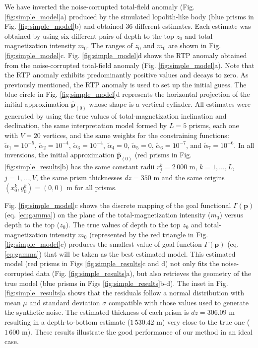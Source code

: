 We have inverted the noise-corrupted total-field anomaly (Fig. \ref{fig:simple_model}a) produced by the simulated lopolith-like body (blue prisms in Fig. \ref{fig:simple_model}b) and obtained 36 different estimates. 
Each estimate was obtained by using six different pairs of depth to the top $ z_0 $ and total-magnetization intensity $ m_0 $.
The ranges of $ z_0 $ and $ m_0 $ are shown in Fig. \ref{fig:simple_model}c. 
Fig. \ref{fig:simple_model}d shows the RTP anomaly obtained from the noise-corrupted 
total-field anomaly (Fig. \ref{fig:simple_model}a).
Note that the RTP anomaly exhibits predominantly positive values and decays to zero.
As previously mentioned, the RTP anomaly is used to set up the initial guess. 
The blue circle in Fig. \ref{fig:simple_model}d represents the horizontal projection 
of the initial approximation $\hat{\mathbf{p}}_{(0)}$ whose shape is a vertical cylinder.
All estimates were generated by using the true values of total-magnetization inclination and declination, the same interpretation model formed by $ L = 5 $ prisms, 
each one with $ V = 20 $ vertices, and the same weights for the constraining functions: 
$\tilde{\alpha}_1 = 10^{-5}$, 
$\tilde{\alpha}_2 = 10^{-4}$, 
$\tilde{\alpha}_3 = 10^{-4}$, 
$\tilde{\alpha}_4 = 0$, 
$\tilde{\alpha}_5 = 0$, 
$\tilde{\alpha}_6 = 10^{-7}$, and 
$\tilde{\alpha}_7 = 10^{-6}$. 
In all inversions, the initial approximation $\hat{\mathbf{p}}_{(0)}$ (red prisms in Fig. \ref{fig:simple_results}b) has the same constant radii $ r^k_j = 2\,000 $ m, 
$ k = 1, \dots, L $, $ j = 1, \dots, V $, the same prism thicknesses $ dz = 350 $ m and the same origins $(x^k_0, y^k_0) = (0, 0) $ m for all prisms.

Fig. \ref{fig:simple_model}c shows the discrete mapping of the goal functional 
$ \Gamma(\mathbf{p}) $ (eq. \ref{eq:gamma}) on the plane of the total-magnetization intensity ($ m_0 $) versus depth to the top ($ z_0 $). 
The true values of depth to the top $ z_0 $ and total-magnetization intensity $ m_0 $ (represented by the red triangle in Fig. \ref{fig:simple_model}c) produces 
the smallest value of goal function $ \Gamma(\mathbf{p}) $ (eq. \ref{eq:gamma})
that will be taken as the best estimated model.
This estimated model (red prisms in Figs \ref{fig:simple_results}c and d) 
not only fits the noise-corrupted data (Fig. \ref{fig:simple_results}a), 
but also retrieves the geometry of the true model (blue prisms in Figs \ref{fig:simple_results}b-d). 
The inset in Fig. \ref{fig:simple_results}a shows that the residuals follow a normal distribution with mean $ \mu $ and standard deviation $ \sigma $ compatible with those values used to generate the synthetic noise. 
The estimated thickness of each prism is $ dz = 306.09 $ m resulting in a depth-to-bottom estimate ($ 1\,530.42$ m) very close to the true one ($ 1\,600 $ m). 
These results illustrate the good performance of our method in an ideal case.


